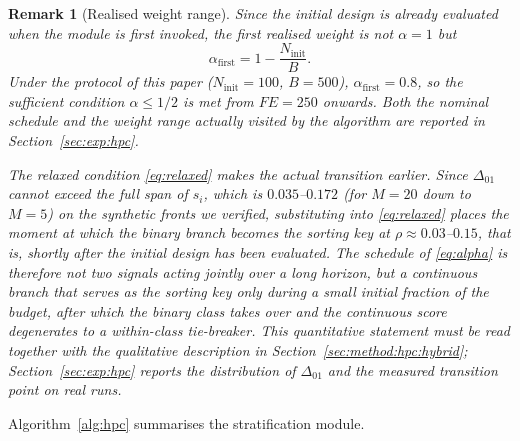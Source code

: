 \documentclass[11pt,a4paper]{article}
\newtheorem{remark}{Remark}
\begin{document}
\begin{remark}[Realised weight range]
\label{rem:alphafirst}
Since the initial design is already evaluated when the module is first invoked,
the first realised weight is not $\alpha=1$ but
\begin{equation}
\alpha_{\mathrm{first}}=1-\frac{N_{\mathrm{init}}}{B} .
\label{eq:alphafirst}
\end{equation}
Under the protocol of this paper ($N_{\mathrm{init}}=100$, $B=500$),
$\alpha_{\mathrm{first}}=0.8$, so the sufficient condition $\alpha\leq1/2$ is met
from $FE=250$ onwards. Both the nominal schedule and the weight range actually
visited by the algorithm are reported in Section~\ref{sec:exp:hpc}.

The relaxed condition \eqref{eq:relaxed} makes the actual transition earlier.
Since $\Delta_{01}$ cannot exceed the full span of $s_i$, which is $0.035$--$0.172$
(for $M=20$ down to $M=5$) on the synthetic fronts we verified, substituting into
\eqref{eq:relaxed} places the moment at which the binary branch becomes the
sorting key at $\rho\approx0.03$--$0.15$, that is, shortly after the initial design
has been evaluated. \emph{The schedule of \eqref{eq:alpha} is therefore not two
signals acting jointly over a long horizon, but a continuous branch that serves as
the sorting key only during a small initial fraction of the budget, after which the
binary class takes over and the continuous score degenerates to a within-class
tie-breaker.} This quantitative statement must be read together with the
qualitative description in Section~\ref{sec:method:hpc:hybrid};
Section~\ref{sec:exp:hpc} reports the distribution of $\Delta_{01}$ and the measured
transition point on real runs.
\end{remark}

Algorithm~\ref{alg:hpc} summarises the stratification module.
\end{document}
